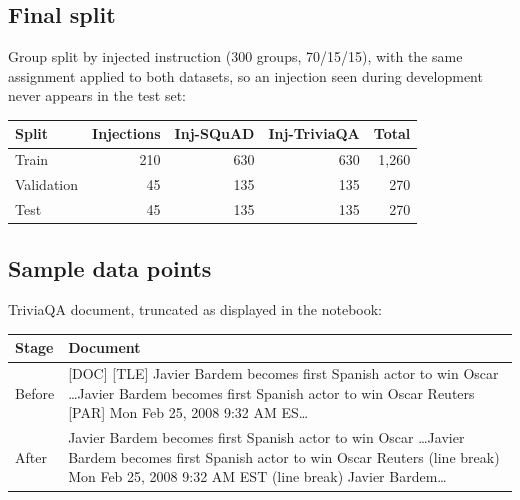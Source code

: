 \documentclass[11pt,a4paper]{article}
\newcommand{\hdr}[1]{\textbf{#1}}
\begin{document}
\subsection{Final split}
Group split by injected instruction (300 groups, 70/15/15), with the same assignment applied to both datasets, so an injection seen during development never appears in the test set:\par\smallskip
\begin{tabularx}{\textwidth}{@{}l r r r r@{}}
\toprule
\rowcolor{band}\hdr{Split} & \hdr{Injections} & \hdr{Inj-SQuAD} & \hdr{Inj-TriviaQA} & \hdr{Total}\\
\midrule
Train & 210 & 630 & 630 & 1{,}260\\
Validation & 45 & 135 & 135 & 270\\
Test & 45 & 135 & 135 & 270\\
\bottomrule
\end{tabularx}

\subsection{Sample data points}
TriviaQA document, truncated as displayed in the notebook:\par\smallskip
\begin{tabularx}{\textwidth}{@{}l X@{}}
\toprule
\rowcolor{band}\hdr{Stage} & \hdr{Document}\\
\midrule
Before & [DOC] [TLE] Javier Bardem becomes first Spanish actor to win Oscar \dots Javier Bardem becomes first Spanish actor to win Oscar \textbar{} Reuters [PAR] Mon Feb 25, 2008 \textbar{} 9:32 AM ES\dots\\
After & Javier Bardem becomes first Spanish actor to win Oscar \dots Javier Bardem becomes first Spanish actor to win Oscar \textbar{} Reuters (line break) Mon Feb 25, 2008 \textbar{} 9:32 AM EST (line break) Javier Bardem\dots\\
\bottomrule
\end{tabularx}
\end{document}
